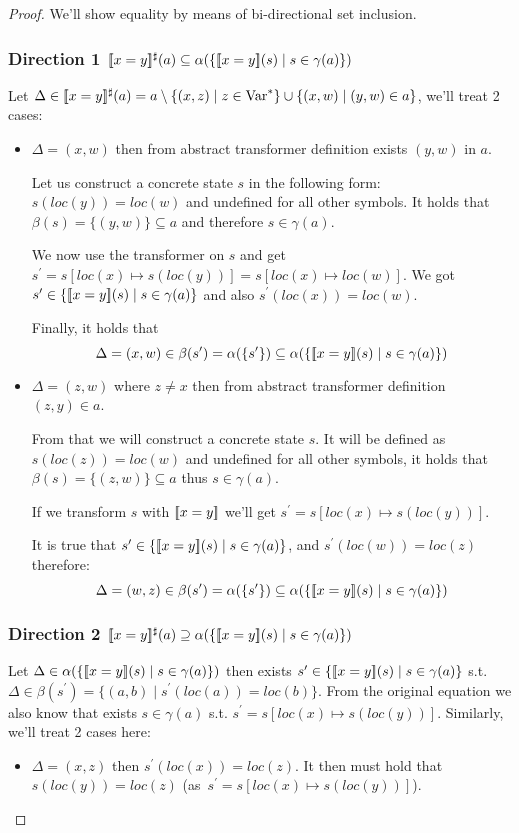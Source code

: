 \begin{proof}
We'll show equality by means of bi-directional set inclusion.
\subsubsection*{Direction 1 $[\![x=y]\!]^\sharp(a)\subseteq\alpha(\{[\![x=y]\!](s)\mid s\in \gamma(a)\})$}
Let $\Delta \in [\![x=y]\!]^\sharp(a)=a\setminus \{(x,z) \mid z\in \text{Var}^*\}\cup\{(x,w)\mid(y,w)\in a\}$, we'll treat 2 cases:
\begin{itemize}
	\item $\Delta=(x,w)$ then from abstract transformer definition exists $(y,w)$ in $a$.
	
	Let us construct a concrete state $s$ in the following form: $s(loc(y))=loc(w)$ and undefined for all other symbols. It holds that $\beta(s)=\{(y,w)\}\subseteq a$ and therefore $s\in\gamma(a)$.
	
	We now use the transformer on $s$ and get $s^\prime=s[loc(x)\mapsto s(loc(y))]{=s[loc(x)\mapsto loc(w)]}$.
	We got $s^\prime\in\{[\![x=y]\!](s)\mid s\in \gamma(a)\}$ and also $s^\prime(loc(x))=loc(w)$.
	
	Finally, it holds that
	\begin{equation*}
		\Delta=(x,w)\in \beta(s^\prime)=\alpha(\{s^\prime\})\subseteq\alpha(\{[\![x=y]\!](s)\mid s\in \gamma(a)\})
	\end{equation*}	
	
	\item $\Delta=(z,w)$ where $z\ne x$ then from abstract transformer definition $(z,y) \in a$. 
	
	From that we will construct a concrete state $s$. It will be defined as ${s(loc(z))=loc(w)}$ and undefined for all other symbols, it holds that $\beta(s)=\{(z,w)\}\subseteq a$ thus $s\in\gamma(a)$.
	
	If we transform $s$ with $[\![x=y]\!]$ we'll get $s^\prime=s[loc(x)\mapsto s(loc(y))]$.
	
	It is true that $s^\prime \in \{[\![x=y]\!](s)\mid s \in \gamma(a)\}$, and $s^\prime(loc(w))=loc(z)$ therefore:
	\begin{equation*}
	\Delta=(w,z)\in\beta(s^\prime)=\alpha(\{s^\prime\})\subseteq\alpha(\{[\![x=y]\!](s)\mid s \in \gamma(a)\})
	\end{equation*}
\end{itemize}
\subsubsection*{Direction 2 $[\![x=y]\!]^\sharp(a)\supseteq\alpha(\{[\![x=y]\!](s)\mid s\in \gamma(a)\})$}
Let $\Delta\in\alpha(\{[\![x=y]\!](s)\mid s\in \gamma(a)\})$ then exists $s^\prime\in\{[\![x=y]\!](s)\mid s\in \gamma(a)\}$ s.t.
$\Delta\in\beta(s^\prime)=\{(a,b)\mid s^\prime(loc(a))=loc(b)\}$. From the original equation we also know that exists $s\in\gamma(a)$ s.t.
$s^\prime=s[loc(x)\mapsto s(loc(y))]$. Similarly, we'll treat 2 cases here:
\begin{itemize}
	\item $\Delta=(x,z)$ then $s^\prime(loc(x))=loc(z)$. It then must hold that $s(loc(y))=loc(z)$ (as~${s^\prime=s[loc(x)\mapsto s(loc(y))]}$).
	

\end{itemize}
\end{proof}
